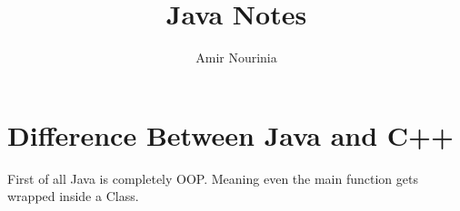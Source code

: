 \documentclass[11pt,twoside,a4paper]{report}
\title{Java Notes}
\author{Amir Nourinia}
\begin{document}
    \maketitle
    \section{Difference Between Java and C++}
        First of all Java is completely OOP. Meaning even the main function gets wrapped inside a Class.
\end{document}
